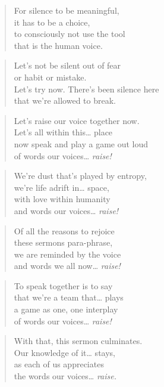 \documentclass[14pt,a4paper]{article}
\begin{document}
\begin{verse}
For silence to be meaningful,\\
it has to be a choice,\\
to consciously not use the tool\\
that is the human voice.
\end{verse}

\begin{verse}
Let’s not be silent out of fear\\
or habit or mistake.\\
Let’s try now. There’s been silence here\\
that we’re allowed to break.
\end{verse}

\begin{verse}
Let’s raise our voice together now.\\
Let’s all within this… place\\
now speak and play a game out loud\\
of words our voices… \emph{raise!}
\end{verse}

\begin{verse}
We’re dust that’s played by entropy,\\
we’re life adrift in… space,\\
with love within humanity\\
and words our voices… \emph{raise!}
\end{verse}

\begin{verse}
Of all the reasons to rejoice\\
these sermons para-phrase,\\
we are reminded by the voice\\
and words we all now… \emph{raise!}
\end{verse}

\begin{verse}
To speak together is to say\\
that we’re a team that… plays\\
a game as one, one interplay\\
of words our voices… \emph{raise!}
\end{verse}

\begin{verse}
With that, this sermon culminates.\\
Our knowledge of it… stays,\\
as each of us appreciates\\
the words our voices… \emph{raise.}
\end{verse}
\end{document}
